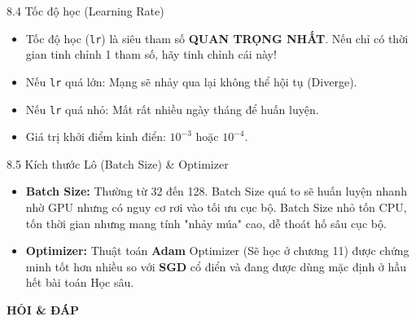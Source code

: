 \documentclass[aspectratio=169, 12pt]{beamer}
\begin{document}
\begin{frame}{8.4 Tốc độ học (Learning Rate)}
    \begin{itemize}
        \item Tốc độ học (\texttt{lr}) là siêu tham số \textbf{QUAN TRỌNG NHẤT}. Nếu chỉ có thời gian tinh chỉnh 1 tham số, hãy tinh chỉnh cái này!
        \item Nếu \texttt{lr} quá lớn: Mạng sẽ nhảy qua lại không thể hội tụ (Diverge).
        \item Nếu \texttt{lr} quá nhỏ: Mất rất nhiều ngày tháng để huấn luyện.
        \item Giá trị khởi điểm kinh điển: $10^{-3}$ hoặc $10^{-4}$.
    \end{itemize}
\end{frame}

\begin{frame}{8.5 Kích thước Lô (Batch Size) \& Optimizer}
    \begin{itemize}
        \item \textbf{Batch Size:} Thường từ 32 đến 128. Batch Size quá to sẽ huấn luyện nhanh nhờ GPU nhưng có nguy cơ rơi vào tối ưu cục bộ. Batch Size nhỏ tốn CPU, tốn thời gian nhưng mang tính "nhảy múa" cao, dễ thoát hố sâu cục bộ.
        \item \textbf{Optimizer:} Thuật toán \textbf{Adam} Optimizer (Sẽ học ở chương 11) được chứng minh tốt hơn nhiều so với \textbf{SGD} cổ điển và đang được dùng mặc định ở hầu hết bài toán Học sâu.
    \end{itemize}
\end{frame}

\begin{frame}
    \centering
    \Huge \textbf{HỎI \& ĐÁP}
\end{frame}
\end{document}
